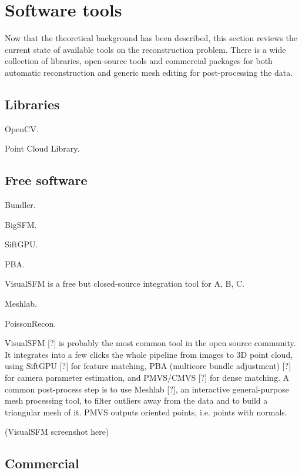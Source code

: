 \section{Software tools}

Now that the theoretical background has been described, this section reviews the current state of available tools on the reconstruction problem. There is a wide collection of libraries, open-source tools and commercial packages for both automatic reconstruction and generic mesh editing for post-processing the data.

\subsection{Libraries}

OpenCV.

Point Cloud Library.

\subsection{Free software}

Bundler.

BigSFM.

SiftGPU.

PBA.

VisualSFM is a free but closed-source integration tool for A, B, C.

Meshlab.

PoissonRecon.

VisualSFM [?] is probably the most common tool in the open source community.
It integrates into a few clicks the whole pipeline from images to 3D point cloud, using SiftGPU [?] for feature matching, PBA (multicore bundle adjustment) [?] for camera parameter estimation, and PMVS/CMVS [?] for dense matching.
A common post-process step is to use Meshlab [?], an interactive general-purpose mesh processing tool, to filter outliers away from the data and to build a triangular mesh of it. PMVS outputs oriented points, i.e. points with normals.

(VisualSFM screenshot here)

\subsection{Commercial}
